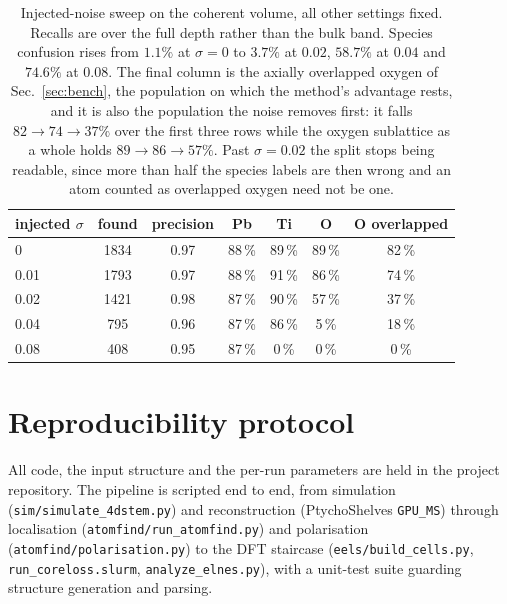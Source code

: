 \documentclass[aps,prb,twocolumn,superscriptaddress,floatfix,nofootinbib]{revtex4-2}
\begin{document}
\begin{table}[t]
  \centering \small
  \begin{tabular}{@{}lcccccc@{}}
    \toprule
    injected $\sigma$ & found & precision & Pb & Ti & O & O overlapped \\
    \midrule
    0                 & 1834 & 0.97 & 88\,\% & 89\,\% & 89\,\% & 82\,\% \\
    0.01              & 1793 & 0.97 & 88\,\% & 91\,\% & 86\,\% & 74\,\% \\
    0.02              & 1421 & 0.98 & 87\,\% & 90\,\% & 57\,\% & 37\,\% \\
    0.04              & \phantom{0}795 & 0.96 & 87\,\% & 86\,\% & \phantom{0}5\,\% & 18\,\% \\
    0.08              & \phantom{0}408 & 0.95 & 87\,\% & \phantom{0}0\,\% & \phantom{0}0\,\% & \phantom{0}0\,\% \\
    \bottomrule
  \end{tabular}
  \caption{Injected-noise sweep on the coherent volume, all other settings fixed. Recalls are
    over the full depth rather than the bulk band. Species confusion rises from $1.1\%$ at $\sigma=0$ to $3.7\%$ at $0.02$, $58.7\%$ at $0.04$ and $74.6\%$ at $0.08$. The final column is the axially overlapped oxygen of Sec.~\ref{sec:bench}, the population on which the method's advantage rests, and it is also the population the noise removes first: it falls $82\to74\to37\%$ over the first three rows while the oxygen sublattice as a whole holds $89\to86\to57\%$. Past $\sigma=0.02$ the split stops being readable, since more than half the species labels are then wrong and an atom counted as overlapped oxygen need not be one.}
  \label{tab:noise}
\end{table}

\section{Reproducibility protocol}
\label{app:repro}
\setcounter{table}{0}
\setcounter{figure}{0}

All code, the input structure and the per-run parameters are held in the project repository. The
pipeline is scripted end to end, from simulation (\texttt{sim/simulate\_4dstem.py}) and
reconstruction (PtychoShelves \texttt{GPU\_MS}) through localisation
(\texttt{atomfind/run\_atomfind.py}) and polarisation (\texttt{atomfind/polarisation.py}) to the
DFT staircase (\texttt{eels/build\_cells.py}, \texttt{run\_coreloss.slurm},
\texttt{analyze\_elnes.py}), with a unit-test suite guarding structure generation and parsing.
\end{document}
